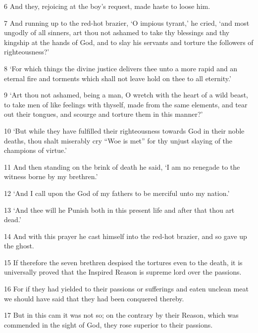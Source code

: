 \par 6 And they, rejoicing at the boy's request, made haste to loose him.

\par 7 And running up to the red-hot brazier, ‘O impious tyrant,’ he cried, ‘and most ungodly of all sinners, art thou not ashamed to take thy blessings and thy kingship at the hands of God, and to slay his servants and torture the followers of righteousness?’

\par 8 ‘For which things the divine justice delivers thee unto a more rapid and an eternal fire and torments which shall not leave hold on thee to all eternity.’

\par 9 ‘Art thou not ashamed, being a man, O wretch with the heart of a wild beast, to take men of like feelings with thyself, made from the same elements, and tear out their tongues, and scourge and torture them in this manner?’

\par 10 ‘But while they have fulfilled their righteousness towards God in their noble deaths, thou shalt miserably cry “Woe is met” for thy unjust slaying of the champions of virtue.’

\par 11 And then standing on the brink of death he said, ‘I am no renegade to the witness borne by my brethren.’

\par 12 ‘And I call upon the God of my fathers to be merciful unto my nation.’

\par 13 ‘And thee will he Punish both in this present life and after that thou art dead.’

\par 14 And with this prayer he cast himself into the red-hot brazier, and so gave up the ghost.

\par 15 If therefore the seven brethren despised the tortures even to the death, it is universally proved that the Inspired Reason is supreme lord over the passions.

\par 16 For if they had yielded to their passions or sufferings and eaten unclean meat we should have said that they had been conquered thereby.

\par 17 But in this cam it was not so; on the contrary by their Reason, which was commended in the sight of God, they rose superior to their passions.


